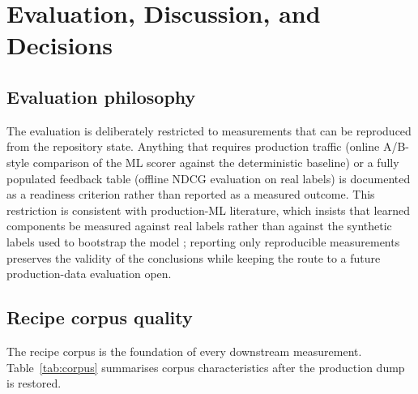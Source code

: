 %
%
\chapter{Evaluation, Discussion, and Decisions}
\label{chap:04}
\setlength{\parskip}{1em}

\section{Evaluation philosophy}

The evaluation is deliberately restricted to measurements that can be reproduced from the repository state. Anything that requires production traffic (online A/B-style comparison of the ML scorer against the deterministic baseline) or a fully populated feedback table (offline NDCG evaluation on real labels) is documented as a readiness criterion rather than reported as a measured outcome. This restriction is consistent with production-ML literature, which insists that learned components be measured against real labels rather than against the synthetic labels used to bootstrap the model \cite{sculley2015}; reporting only reproducible measurements preserves the validity of the conclusions while keeping the route to a future production-data evaluation open.

\section{Recipe corpus quality}

The recipe corpus is the foundation of every downstream measurement. Table~\ref{tab:corpus} summarises corpus characteristics after the production dump is restored.

